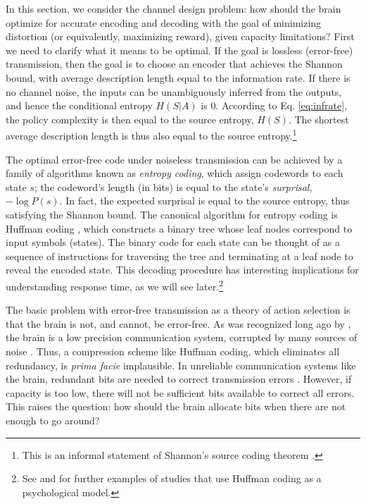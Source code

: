 \documentclass[11pt]{article}
\begin{document}
In this section, we consider the channel design problem: how should the brain optimize for accurate encoding and decoding with the goal of minimizing distortion (or equivalently, maximizing reward), given capacity limitations? First we need to clarify what it means to be optimal. If the goal is lossless (error-free) transmission, then the goal is to choose an encoder that achieves the Shannon bound, with average description length equal to the information rate. If there is no channel noise, the inputs can be unambiguously inferred from the outputs, and hence the conditional entropy $H(S|A)$ is 0. According to Eq. \ref{eq:infrate}, the policy complexity is then equal to the source entropy, $H(S)$. The shortest average description length is thus also equal to the source entropy.\footnote{This is an informal statement of Shannon's source coding theorem \citep{shannon48}.}

The optimal error-free code under noiseless transmission can be achieved by a family of algorithms known as \emph{entropy coding}, which assign codewords to each state $s$; the codeword's length (in bits) is equal to the state's \emph{surprisal}, $-\log P(s)$. In fact, the expected surprisal is equal to the source entropy, thus satisfying the Shannon bound. The canonical algorithm for entropy coding is Huffman coding \citep{huffman52}, which constructs a binary tree whose leaf nodes correspond to input symbols (states). The binary code for each state can be thought of as a sequence of instructions for traversing the tree and terminating at a leaf node to reveal the encoded state. This decoding procedure has interesting implications for understanding response time, as we will see later.\footnote{See \citet{brady09} and \citet{norris20} for further examples of studies that use Huffman coding as a psychological model.}

The basic problem with error-free transmission as a theory of action selection is that the brain is not, and cannot, be error-free. As was recognized long ago by \citet{vonneumann58}, the brain is a low precision communication system, corrupted by many sources of noise \citep[see][for a contemporary review]{faisal08}. Thus, a compression scheme like Huffman coding, which eliminates all redundancy, is \emph{prima facie} implausible. In unreliable communication systems like the brain, redundant bits are needed to correct transmission errors \citep{bhui18,tkavcik10}. However, if capacity is too low, there will not be sufficient bits available to correct all errors. This raises the question: how should the brain allocate bits when there are not enough to go around?
\end{document}
